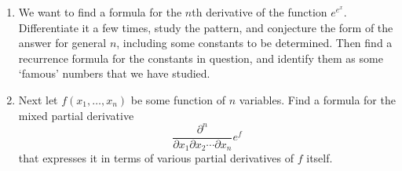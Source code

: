 \begin{exercise}
    \begin{enumerate}[label=(\alph*)]
        \item We want to find a formula for the $n$th derivative of the function $e^{e^x}$. Differentiate it a few times, study the pattern, and conjecture the form of the answer for general $n$, including some constants to be determined. Then find a recurrence formula for the constants in question, and identify them as some `famous' numbers that we have studied.
        \item Next let $f(x_1,\ldots,x_n)$ be some function of $n$ variables. Find a formula for the mixed partial derivative 
        \[
            \frac{\partial^n}{\partial x_1\partial x_2\cdots\partial x_n}e^f
        \]
        that expresses it in terms of various partial derivatives of $f$ itself.
    \end{enumerate}
\end{exercise}

